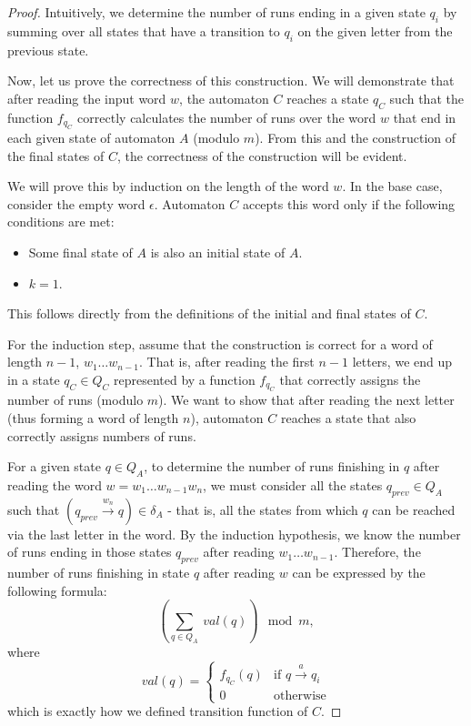 \documentclass[12pt]{article}
\theoremstyle{definition}
\begin{document}
\begin{proof}
    Intuitively, we determine the number of runs ending in a given state $q_i$ by summing over all states that have a transition to $q_i$ on the given letter from the previous state.

    Now, let us prove the correctness of this construction. We will demonstrate that after reading the input word $w$, the automaton $C$ reaches a state $q_C$ such that the function $f_{q_C}$ correctly calculates the number of runs over the word $w$ that end in each given state of automaton $A$ (modulo $m$). From this and the construction of the final states of $C$, the correctness of the construction will be evident.

    We will prove this by induction on the length of the word $w$. In the base case, consider the empty word $\epsilon$. Automaton $C$ accepts this word only if the following conditions are met:
    \begin{itemize}
        \item Some final state of $A$ is also an initial state of $A$.
        \item $k = 1$.
    \end{itemize}
    This follows directly from the definitions of the initial and final states of $C$.
    
    For the induction step, assume that the construction is correct for a word of length $n-1$, $w_1 \ldots w_{n-1}$. That is, after reading the first $n-1$ letters, we end up in a state $q_C \in Q_C$ represented by a function $f_{q_C}$ that correctly assigns the number of runs (modulo $m$). We want to show that after reading the next letter (thus forming a word of length $n$), automaton $C$ reaches a state that also correctly assigns numbers of runs. 
    
    For a given state $q \in Q_A$, to determine the number of runs finishing in $q$ after reading the word $w = w_1\ldots w_{n-1}w_n$, we must consider all the states $q_{prev} \in Q_A$ such that $(q_{prev} \xrightarrow{w_n} q) \in \delta_A$ - that is, all the states from which $q$ can be reached via the last letter in the word. By the induction hypothesis, we know the number of runs ending in those states $q_{prev}$ after reading $w_1 \ldots w_{n-1}$. Therefore, the number of runs finishing in state $q$ after reading $w$ can be expressed by the following formula:
    $$(\sum_{q \in Q_A} \ val(q)) \mod m,$$
    where
    \begin{equation*}
        val(q) =
            \begin{cases}
            f_{q_C}(q) & \text{if $q \xrightarrow{a} q_i$} \\
            0 & \text{otherwise}
            \end{cases}       
    \end{equation*}
    which is exactly how we defined transition function of $C$.
\end{proof}
\end{document}
